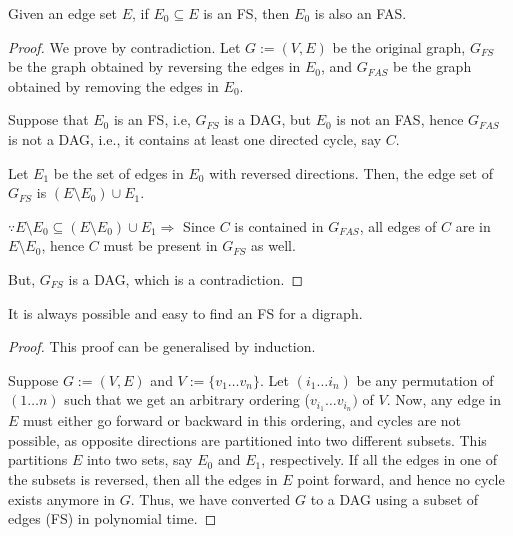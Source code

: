 \documentclass{beamer}
\begin{document}
\begin{frame}
    

    \begin{lemma}

        Given an edge set $E$, if $E_0 \subseteq E$ is an FS, then $E_0$ is also an FAS.

    \end{lemma}

    \begin{proof}

        We prove by contradiction. Let $G := (V, E)$ be the original graph, $G_{FS}$ be the graph obtained by reversing the edges in $E_0$, and $G_{FAS}$ be the graph obtained by removing the edges in $E_0$.

        Suppose that $E_0$ is an FS, i.e, $G_{FS}$ is a DAG, but $E_0$ is not an FAS, hence $G_{FAS}$ is not a DAG, i.e., it contains at least one directed cycle, say $C$.

        Let $E_1$ be the set of edges in $E_0$ with reversed directions. Then, the edge set of $G_{FS}$ is $(E \setminus E_0) \cup E_1$.

        $\because E \setminus E_0 \subseteq (E \setminus E_0) \cup E_1 \Rightarrow$ Since $C$ is contained in $G_{FAS}$, all edges of $C$ are in $E \setminus E_0$, hence $C$ must be present in $G_{FS}$ as well.

        But, $G_{FS}$ is a DAG, which is a contradiction.

    \end{proof}

\end{frame}


\begin{frame}
    

    \begin{lemma}
        
        It is always possible and easy to find an FS for a digraph.

    \end{lemma}

    \begin{proof}
        
        This proof can be generalised by induction.

        Suppose $G := (V, E)$ and $V := \{v_1 \dots v_n\}$. Let $(i_1 \dots i_n)$ be any permutation of $(1 \dots n)$ such that we get an arbitrary ordering ($v_{i_1} \dots v_{i_n})$ of $V$. Now, any edge in $E$ must either go forward or backward in this ordering, and cycles are not possible, as opposite directions are partitioned into two different subsets. This partitions $E$ into two sets, say $E_0$ and $E_1$, respectively. If all the edges in one of the subsets is reversed, then all the edges in $E$ point forward, and hence no cycle exists anymore in $G$. Thus, we have converted $G$ to a DAG using a subset of edges (FS) in polynomial time.

    \end{proof}


\end{frame}
\end{document}
